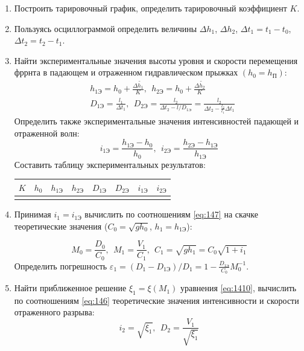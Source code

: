 \documentclass[specialist, subf, href, colorlinks=true, 14pt, final]{disser}
\theoremstyle{definition}
\begin{document}
\begin{enumerate}
  \item Построить тарировочный график, определить тарировочный коэффициент $K$.
  \item Пользуясь осциллограммой определить величины $\Delta h_{1}$, $\Delta h_{2}$, $\Delta t_{1} = t_{1} - t_{0}$, $\Delta t_{2} = t_{2} - t_{1}$.
  \item Найти экспериментальные значения высоты уровня и скорости перемещения фррнта в падающем и отраженном гидравлическом прыжках $(h_{0} = h_{\text{П}})$:
  \[
    \begin{aligned}
    &h_{1\text{Э}} = h_{0} + \frac{\Delta\widetilde{h_1}}{K},\ \ h_{2\text{Э}} = h_{0} + \frac{\Delta\widetilde{h_2}}{K}\\
    &D_{1\text{Э}} = \frac{l_1}{\Delta t_1},\ \ D_{2\text{Э}} = \frac{l_2}{\Delta t_{2} - l/D_{1\text{Э}}} = \frac{l_2}{\Delta t_{2} - \frac{l_2}{l_1}\Delta t_{1}}
    \end{aligned}
  \]
  Определить также экспериментальные значения интенсивностей падающей и отраженной волн:
  \[
    i_{1\text{Э}} = \frac{h_{1\text{Э}} - h_{0}}{h_0},\ \ i_{2\text{Э}} = \frac{h_{2\text{Э}} - h_{1\text{Э}}}{h_{1\text{Э}}}
  \]
  Составить таблицу экспериментальных результатов:
  \begin{center}
  \begin{tabular}{|c|c|c|c|c|c|c|c|}
  \hline
  $K$ & $h_0$ & $h_{1\text{Э}}$ & $h_{2\text{Э}}$ & $D_{1\text{Э}}$ & $D_{2\text{Э}}$ & $i_{1\text{Э}}$ & $i_{2\text{Э}}$\\
  \hline
  & & & & & & & \\
  \hline
  \end{tabular}
  \end{center}
  
  \item Принимая $i_{1} = i_{1\text{Э}}$ вычислить по соотношениям \eqref{eq:147} на скачке теоретические значения ($C_{0} = \sqrt{gh_0}$, $h_{1} = h_{1\text{Э}}$):
  \addtocounter{equation}{1}
  \begin{equation}\label{eq:1411}
    M_{0} = \frac{D_0}{C_0},\ \ M_{1} = \frac{V_1}{C_1},\ \ C_{1} = \sqrt{gh_1} = C_{0}\sqrt{1 + i_{1}}
    \tag{11}
  \end{equation}
  Определить погрешность $\varepsilon_{1} = (D_{1} - D_{1\text{Э}}) / D_{1} = 1 - \frac{D_{1\text{Э}}}{C_{0}}M_{0}^{-1}$.
  
  \item Найти приближенное решение $\xi_{1} = \xi(M_1)$ уравнения \eqref{eq:1410}, вычислить по соотношениям \eqref{eq:146} теоретические значения интенсивности и скорости отраженного разрыва:
  \[
    i_{2} = \sqrt{\xi_{1}},\ \ D_{2} = \frac{V_1}{\sqrt{\xi_1}}  
  \]
  

\end{enumerate}
\end{document}
